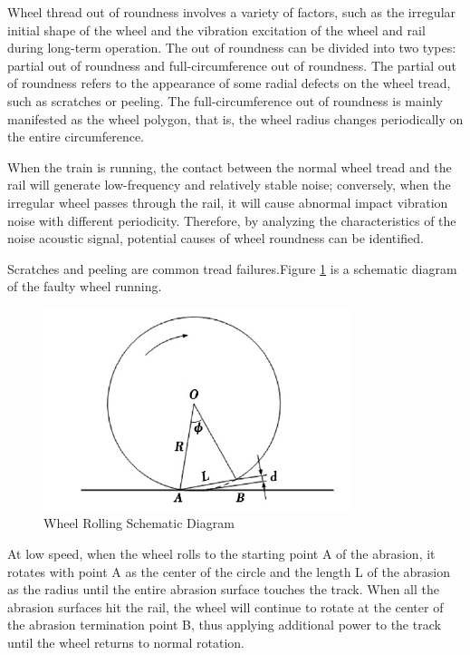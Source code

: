 \documentclass{article}
\begin{document}
Wheel thread out of roundness involves a variety of factors, such as the irregular initial shape of the wheel and the vibration excitation of the wheel and rail during long-term operation. The out of roundness can be divided into two types: partial out of roundness and full-circumference out of roundness. The partial out of roundness refers to the appearance of some radial defects on the wheel tread, such as scratches or peeling. The full-circumference out of roundness is mainly manifested as the wheel polygon, that is, the wheel radius changes periodically on the entire circumference.

When the train is running, the contact between the normal wheel tread and the rail will generate low-frequency and relatively stable noise; conversely, when the irregular wheel passes through the rail, it will cause abnormal impact vibration noise with different periodicity. Therefore, by analyzing the characteristics of the noise acoustic signal, potential causes of wheel roundness can be identified.

Scratches and peeling are common tread failures.Figure \ref{fig:wheel-rolling} is a schematic diagram of the faulty wheel running.
\begin{figure}[htbp]
    \centering
    \includegraphics[width=0.8\textwidth]{./Wheel rolling.png}
    \caption{Wheel Rolling Schematic Diagram} 
    \label{fig:wheel-rolling}
\end{figure}

At low speed, when the wheel rolls to the starting point A of the abrasion, it rotates with point A as the center of the circle and the length L of the abrasion as the radius until the entire abrasion surface touches the track. When all the abrasion surfaces hit the rail, the wheel will continue to rotate at the center of the abrasion termination point B, thus applying additional power to the track until the wheel returns to normal rotation.
\end{document}
